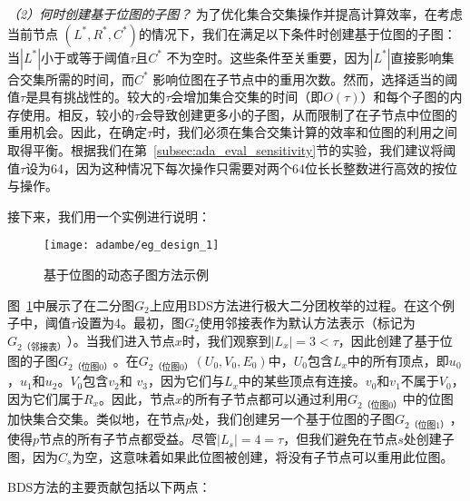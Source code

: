\textit{（2）何时创建基于位图的子图？ }为了优化集合交集操作并提高计算效率，在考虑当前节点 $(L^*, R^*, C^*)$的情况下，我们在满足以下条件时创建基于位图的子图：当$|L^*|$小于或等于阈值$\tau$且$C^*$ 不为空时。这些条件至关重要，因为$|L^*|$直接影响集合交集所需的时间，而$C^*$ 影响位图在子节点中的重用次数。然而，选择适当的阈值$\tau$是具有挑战性的。较大的$\tau$会增加集合交集的时间（即$O(\tau)$）和每个子图的内存使用。相反，较小的$\tau$会导致创建更多小的子图，从而限制了在子节点中位图的重用机会。因此，在确定$\tau$时，我们必须在集合交集计算的效率和位图的利用之间取得平衡。根据我们在第~\ref{subsec:ada_eval_sensitivity}节的实验，我们建议将阈值$\tau$设为64，因为这种情况下每次操作只需要对两个64位长长整数进行高效的按位与操作。

接下来，我们用一个实例进行说明：

\begin{figure} [H]
	\centering
  \vspace{0.05in}
	\texttt{[image: adambe/eg\_design\_1]}
  \vspace{0.02in}
	\caption{基于位图的动态子图方法示例}

	\label{fig:ada_design1}
\end{figure}

\begin{example}
  图~\ref{fig:ada_design1}中展示了在二分图$G_2$上应用BDS方法进行极大二分团枚举的过程。在这个例子中，阈值$\tau$设置为4。最初，图$G_2$使用邻接表作为默认方法表示（标记为$G_{2（邻接表）}$）。当我们进入节点$x$时，我们观察到$|L_x| = 3 < \tau$，因此创建了基于位图的子图$G_{2（位图0）}$。在$G_{2（位图0）}(U_0, V_0, E_0)$中，$U_0$包含$L_x$中的所有顶点，即$u_0$，$u_1$和$u_2$。$V_0$包含$v_2$和 $v_3$，因为它们与$L_x$中的某些顶点有连接。$v_0$和$v_1$不属于$V_0$，因为它们属于$R_x$。因此，节点$x$的所有子节点都可以通过利用$G_{2（位图0）}$中的位图加快集合交集。类似地，在节点$p$处，我们创建另一个基于位图的子图$G_{2（位图1）}$，使得$p$节点的所有子节点都受益。尽管$|L_s| = 4 = \tau$，但我们避免在节点$s$处创建子图，因为$C_s$为空，这意味着如果此位图被创建，将没有子节点可以重用此位图。
  
\end{example}

  BDS方法的主要贡献包括以下两点：


